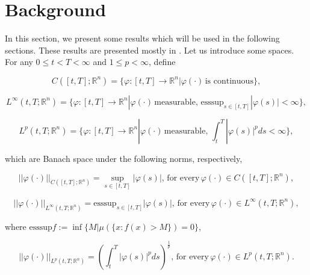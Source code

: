 \section{Background}

    In this section, we present some results which will be used in the 
    following sections. These results are presented mostly in \cite{Yong2015}.
    Let us introduce some spaces. For any 
    $0\leq t< T<\infty$ and $1\leq p <\infty$, define
    
    \begin{equation*}
        C([t,T];\mathbb{R}^n)=\{
            \varphi:[t,T]\rightarrow \mathbb{R}^n | 
            \varphi(\cdot)\,\mbox{is continuous}
        \},
    \end{equation*}

\begin{equation*}
\displaystyle L^{\infty}(t,T;\mathbb{R}^n)=\{\varphi:[t,T]\rightarrow \mathbb{R}^n | \varphi(\cdot)\,\mbox{measurable},\, \displaystyle \mbox{esssup}_{s\in[t,T]}|\varphi(s)|<\infty\},
\end{equation*}

\begin{equation*}
\displaystyle L^{p}(t,T;\mathbb{R}^n)=\{\varphi:[t,T]\rightarrow \mathbb{R}^n | \varphi(\cdot)\,\mbox{measurable},\, \int_{t}^{T}|\varphi(s)|^p ds<\infty\},
\end{equation*}

which are Banach space under the following norms, respectively, 

\begin{equation*}
||\varphi(\cdot)||_{C([t,T];\mathbb{R}^n)}=\sup_{s\in[t,T]} |\varphi(s)|,\,\mbox{for every}\, \varphi(\cdot) \in C([t,T];\mathbb{R}^n),
\end{equation*}

\begin{equation*}
||\varphi(\cdot)||_{L^{\infty}(t,T;\mathbb{R}^n)}=\mbox{esssup}_{s\in[t,T]} |\varphi(s)|,\,\mbox{for every}\, \varphi(\cdot) \in L^{\infty}(t,T;\mathbb{R}^n),
\end{equation*}

where $\mbox{esssup} f:=\inf\{M | \mu(\{x: f(x)>M\})=0\}$,

\begin{equation*}
||\varphi(\cdot)||_{L^{p}(t,T;\mathbb{R}^n)}=\left(\int_{t}^{T}|\varphi(s)|^p ds\right)^\frac{1}{p},\,\mbox{for every}\, \varphi(\cdot) \in L^{p}(t,T;\mathbb{R}^n).
\end{equation*}


